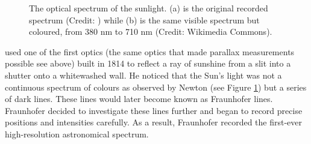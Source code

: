 \begin{figure}[!htb]
    \centering
    \vfill
    \vfill
    \caption{The optical spectrum of the sunlight. (a) is the original recorded spectrum (Credit: \citet{fraunhofer_first_1817}) while (b) is the same visible spectrum but coloured, from 380 nm to 710 nm (Credit: Wikimedia Commons).} 
    \label{fig:Fraunhofer_lines}
\end{figure}

\citet{fraunhofer_first_1817} used one of the first optics (the same optics that made parallax measurements possible see above) built in 1814 to reflect a ray of sunshine from a slit into a shutter onto a whitewashed wall. 
He noticed that the Sun's light was not a continuous spectrum of colours as observed by Newton \cite{newton_new_1993} 
(see Figure \ref{fig:Fraunhofer_lines}) but a series of dark lines. These lines would later become known as Fraunhofer 
lines. Fraunhofer decided to investigate these lines further and began to record precise positions and intensities 
carefully. As a result, Fraunhofer recorded the first-ever high-resolution astronomical spectrum.

